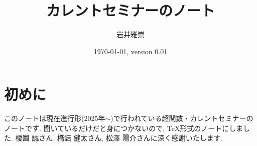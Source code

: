 \documentclass[dvipdfmx,a4paper,11pt]{report} %
\title{カレントセミナーのノート}
\author{岩井雅崇}
\date{\today, version 0.01}
\theoremstyle{definition}
\theoremstyle{remark}
\numberwithin{equation}{section}
\begin{document}
\maketitle
\tableofcontents %

\chapter*{初めに}
このノートは現在進行形(2025年$\sim$)で行われている超関数・カレントセミナーのノートです.
聞いているだけだと身につかないので, TeX形式のノートにしました. 
榎園 誠さん, 橋詰 健太さん, 松澤 陽介さんに深く感謝いたします. 



 
 

\end{document}
